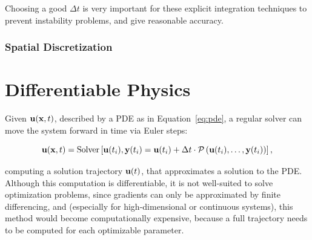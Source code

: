 Choosing a good $\Delta t$ is very important for these explicit integration
techniques to prevent instability problems, and give reasonable accuracy. 

\subsubsection*{Spatial Discretization}

\section{Differentiable Physics}
Given $\vb{u}(\vb{x}, t)$, described by a \ac{PDE} as in Equation~\eqref{eq:pde}, a regular
solver can move the system forward in time via Euler steps:

$$\vb{u}(\vb{x},t) = \text{Solver}\left[ \vb{u}(t_i), \vb{y}(t_i) = 
  \vb{u}(t_i) + \Delta t \cdot \mathcal{P} \left( 
    \vb{u}(t_i), \dots, \vb{y}(t_i)
  \right)
\right],$$

computing a solution trajectory $\vb{u}(t)$, that approximates a solution to the
\ac{PDE}. Although this computation is differentiable, it is not well-suited to
solve optimization problems, since gradients can only be approximated by finite
differencing, and (especially for high-dimensional or continuous systems), this
method would become computationally expensive, because a full trajectory needs
to be computed for each optimizable parameter.

